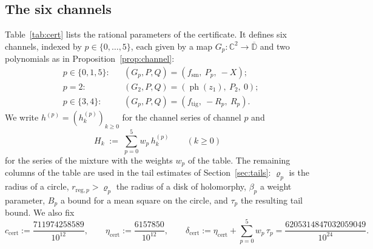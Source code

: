 \documentclass[11pt,reqno]{amsart}
\theoremstyle{definition}
\numberwithin{equation}{section}
\newcommand{\C}{\mathbb{C}}
\newcommand{\D}{\mathbb{D}}
\newcommand{\ph}{\operatorname{ph}}
\newcommand{\ftig}{f_{\mathrm{tig}}}
\newcommand{\fsm}{f_{\mathrm{sm}}}
\newcommand{\ccert}{c_{\mathrm{cert}}}
\newcommand{\dcert}{\delta_{\mathrm{cert}}}
\begin{document}
\subsection{The six channels}
Table~\ref{tab:cert} lists the rational parameters of the certificate. It defines six channels, indexed by $p \in \{0,\dots,5\}$, each given by a map $G_p:\C^2\to\overline{\D}$ and two polynomials as in Proposition~\ref{prop:channel}:
\begin{equation}\label{eq:six-channels}
\begin{aligned}
  &p\in\{0,1,5\}: && (G_p,P,Q)=(\fsm,\ P_p,\ -X);\\
  &p=2: && (G_2,P,Q)=(\ph(z_1),\ P_2,\ 0);\\
  &p\in\{3,4\}: && (G_p,P,Q)=(\ftig,\ -R_p,\ R_p).
\end{aligned}
\end{equation}
We write $h^{(p)}=(h^{(p)}_k)_{k\ge0}$ for the channel series of channel $p$ and
\[
  H_k\;:=\;\sum_{p=0}^5w_p\,h^{(p)}_k\qquad(k\ge0)
\]
for the series of the mixture with the weights $w_p$ of the table. The remaining columns of the table are used in the tail estimates of Section~\ref{sec:tails}: $\varrho_p$ is the radius of a circle, $r_{\mathrm{reg},p}>\varrho_p$ the radius of a disk of holomorphy, $\beta_p$ a weight parameter, $B_p$ a bound for a mean square on the circle, and $\tau_p$ the resulting tail bound. We also fix
\begin{equation}\label{eq:cert-consts}
  \ccert := \frac{711974258589}{10^{12}},\qquad
  \eta_{\mathrm{cert}} := \frac{6157850}{10^{12}},\qquad
  \dcert := \eta_{\mathrm{cert}}+\sum_{p=0}^5w_p\,\tau_p=\frac{6205314847032059049}{10^{24}} .
\end{equation}
\end{document}
